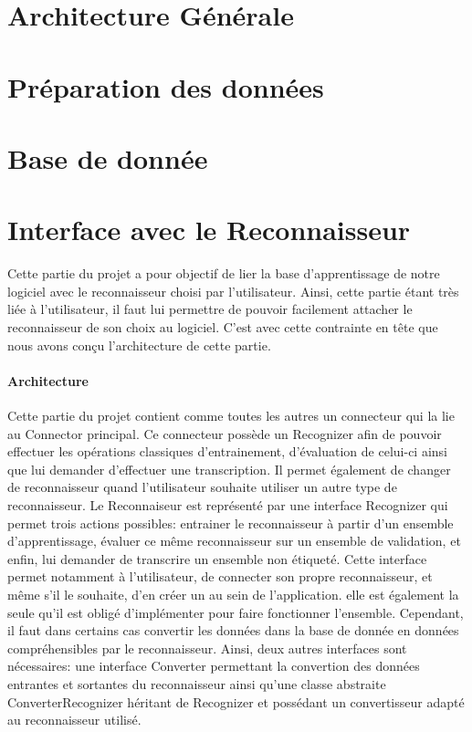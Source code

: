 \section{Architecture Générale}
\section{Préparation des données}
\section{Base de donnée}

\section{Interface avec le Reconnaisseur}

Cette partie du projet a pour objectif de lier la base d'apprentissage de notre logiciel avec le reconnaisseur choisi par l'utilisateur. Ainsi, cette partie étant très liée à l'utilisateur, il faut lui permettre de pouvoir facilement attacher le reconnaisseur de son choix au logiciel. C'est avec cette contrainte en tête que nous avons conçu l'architecture de cette partie.



\paragraph{Architecture}

Cette partie du projet contient comme toutes les autres un connecteur qui la lie au Connector principal. Ce connecteur possède un Recognizer afin de pouvoir effectuer les opérations classiques d'entrainement, d'évaluation de celui-ci ainsi que lui demander d'effectuer une transcription. Il permet également de changer de reconnaisseur quand l'utilisateur souhaite utiliser un autre type de reconnaisseur.
Le Reconnaiseur est représenté par une interface Recognizer qui permet trois actions possibles: entrainer le reconnaisseur à partir d'un ensemble d'apprentissage, évaluer ce même reconnaisseur sur un ensemble de validation, et enfin, lui demander de transcrire un ensemble non étiqueté.
Cette interface permet notamment à l'utilisateur, de connecter son propre reconnaisseur, et même s'il le souhaite, d'en créer un au sein de l'application. elle est également la seule qu'il est obligé d'implémenter pour faire fonctionner l'ensemble. Cependant, il faut dans certains cas convertir les données dans la base de donnée en données compréhensibles par le reconnaisseur. Ainsi, deux autres interfaces sont nécessaires: une interface Converter permettant la convertion des données entrantes et sortantes du reconnaisseur ainsi qu'une classe abstraite ConverterRecognizer héritant de Recognizer et possédant un convertisseur adapté au reconnaisseur utilisé.